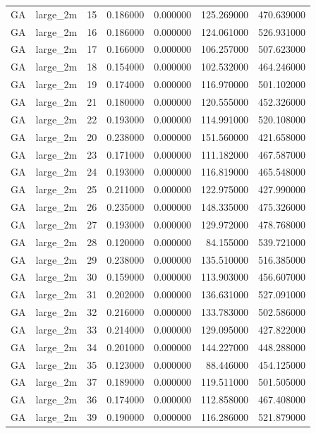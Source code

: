 \begin{tabular}{llrrrrr}
GA & large_2m & 15 & 0.186000 & 0.000000 & 125.269000 & 470.639000 \\
GA & large_2m & 16 & 0.186000 & 0.000000 & 124.061000 & 526.931000 \\
GA & large_2m & 17 & 0.166000 & 0.000000 & 106.257000 & 507.623000 \\
GA & large_2m & 18 & 0.154000 & 0.000000 & 102.532000 & 464.246000 \\
GA & large_2m & 19 & 0.174000 & 0.000000 & 116.970000 & 501.102000 \\
GA & large_2m & 21 & 0.180000 & 0.000000 & 120.555000 & 452.326000 \\
GA & large_2m & 22 & 0.193000 & 0.000000 & 114.991000 & 520.108000 \\
GA & large_2m & 20 & 0.238000 & 0.000000 & 151.560000 & 421.658000 \\
GA & large_2m & 23 & 0.171000 & 0.000000 & 111.182000 & 467.587000 \\
GA & large_2m & 24 & 0.193000 & 0.000000 & 116.819000 & 465.548000 \\
GA & large_2m & 25 & 0.211000 & 0.000000 & 122.975000 & 427.990000 \\
GA & large_2m & 26 & 0.235000 & 0.000000 & 148.335000 & 475.326000 \\
GA & large_2m & 27 & 0.193000 & 0.000000 & 129.972000 & 478.768000 \\
GA & large_2m & 28 & 0.120000 & 0.000000 & 84.155000 & 539.721000 \\
GA & large_2m & 29 & 0.238000 & 0.000000 & 135.510000 & 516.385000 \\
GA & large_2m & 30 & 0.159000 & 0.000000 & 113.903000 & 456.607000 \\
GA & large_2m & 31 & 0.202000 & 0.000000 & 136.631000 & 527.091000 \\
GA & large_2m & 32 & 0.216000 & 0.000000 & 133.783000 & 502.586000 \\
GA & large_2m & 33 & 0.214000 & 0.000000 & 129.095000 & 427.822000 \\
GA & large_2m & 34 & 0.201000 & 0.000000 & 144.227000 & 448.288000 \\
GA & large_2m & 35 & 0.123000 & 0.000000 & 88.446000 & 454.125000 \\
GA & large_2m & 37 & 0.189000 & 0.000000 & 119.511000 & 501.505000 \\
GA & large_2m & 36 & 0.174000 & 0.000000 & 112.858000 & 467.408000 \\
GA & large_2m & 39 & 0.190000 & 0.000000 & 116.286000 & 521.879000 \\

\end{tabular}

